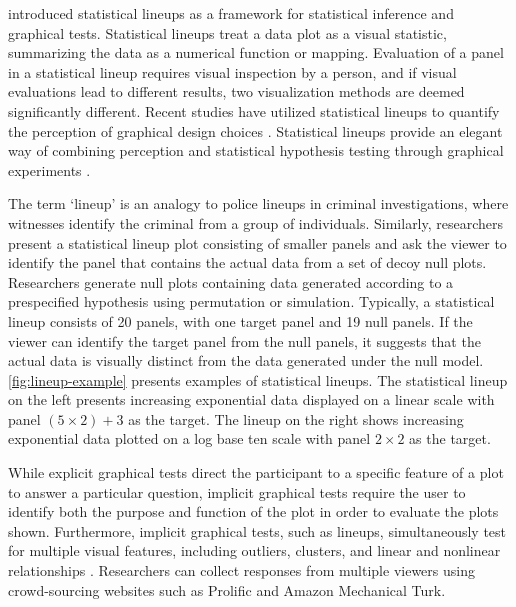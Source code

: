 \documentclass[12pt]{article}
\begin{document}
\citet{buja_statistical_2009} introduced statistical lineups as a
framework for statistical inference and graphical tests. Statistical
lineups treat a data plot as a visual statistic, summarizing the data as
a numerical function or mapping. Evaluation of a panel in a statistical
lineup requires visual inspection by a person, and if visual evaluations
lead to different results, two visualization methods are deemed
significantly different. Recent studies have utilized statistical
lineups to quantify the perception of graphical design choices
\citep{hofmann_graphical_2012, loy_model_2017, loy_variations_2016, vanderplas_clusters_2017}.
Statistical lineups provide an elegant way of combining perception and
statistical hypothesis testing through graphical experiments
\citep{majumder_validation_2013, vanderplas_testing_2020, wickham2010graphical}.

The term `lineup' is an analogy to police lineups in criminal
investigations, where witnesses identify the criminal from a group of
individuals. Similarly, researchers present a statistical lineup plot
consisting of smaller panels and ask the viewer to identify the panel
that contains the actual data from a set of decoy null plots.
Researchers generate null plots
{\textcolor{RedOrange}{containing data generated according to a prespecified hypothesis using permutation or simulation}}.
Typically, a statistical lineup consists of 20 panels, with one target
panel and 19 null panels. If the viewer can identify the target panel
from the null panels, it suggests that the actual data is visually
distinct from the data generated under the null model.
\cref{fig:lineup-example} presents examples of statistical lineups. The
statistical lineup on the left presents increasing exponential data
displayed on a linear scale with panel \((5 \times 2) + 3\) as the
target. The lineup on the right shows increasing exponential data
plotted on a log base ten scale with panel \(2 \times 2\) as the target.

While explicit graphical tests direct the participant to a specific
feature of a plot to answer a particular question, implicit graphical
tests require the user to identify both the purpose and function of the
plot in order to evaluate the plots shown. Furthermore, implicit
graphical tests, such as lineups, simultaneously test for multiple
visual features, including outliers, clusters, and linear and nonlinear
relationships \citep{vanderplas2015spatial}. Researchers can collect
responses from multiple viewers using crowd-sourcing websites such as
Prolific and Amazon Mechanical Turk.
\end{document}
